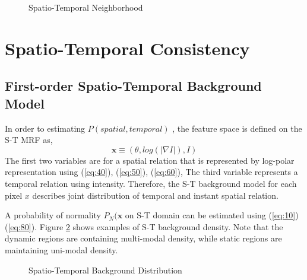 \documentclass[conference]{IEEEtran}
\begin{document}
\begin{figure}[!t]
  \centering
  \label{fig:50}
  \caption{Spatio-Temporal Neighborhood}
\end{figure}


\section{Spatio-Temporal Consistency}

\subsection{First-order Spatio-Temporal Background Model}
In order to estimating \begin{math} P(spatial, temporal) \end{math} , the feature space is defined on the S-T MRF as,
\begin{equation}\label{eq:80}
  \mathbf{x} \equiv (\theta, log(|\nabla I|), I)
\end{equation}
The first two variables are for a spatial relation that is represented by log-polar representation using (\ref{eq:40}), (\ref{eq:50}), (\ref{eq:60}), The third variable represents a temporal relation using intensity. Therefore, the S-T background model for each pixel \begin{math} x \end{math} describes joint distribution of temporal and instant spatial relation. 

A probability of normality \begin{math} P_N(\mathbf{x} \end{math}  on S-T domain can be estimated using (\ref{eq:10}) (\ref{eq:80}). Figure \ref{fig:60} shows examples of S-T background density. Note that the dynamic regions are containing multi-modal density, while static regions are maintaining uni-modal density.

\begin{figure}[!t]
  \centering
  \label{fig:60}
  \caption{Spatio-Temporal Background Distribution}
\end{figure}
\end{document}
